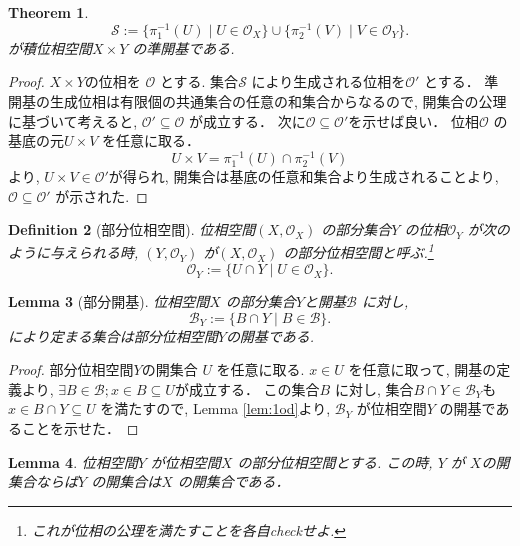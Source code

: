 \documentclass[lualatex]{ltjsbook}
\newtheorem{theorem}{Theorem}[chapter]
\newtheorem{lemma}[theorem]{Lemma}
\newtheorem{definition}[theorem]{Definition}
\theoremstyle{remark}
\theoremstyle{plain}
\begin{document}
\begin{theorem}
	\[
	\mathcal{S}:= \{\pi_1^{-1} \left( U \right)  \mid U \in \mathcal{O}_X		\} \cup \{ \pi_2^{-1} \left( V \right)   \mid  V \in \mathcal{O}_Y\} 
	.\] 
	が積位相空間$X \times Y$ の準開基である.
\end{theorem}

\begin{proof}
	$X\times Y$の位相を $\mathcal{O}$ とする.
	集合$\mathcal{S}$ により生成される位相を$\mathcal{O}'$ とする．
	準開基の生成位相は有限個の共通集合の任意の和集合からなるので,  開集合の公理に基づいて考えると,  $\mathcal{O}' \subseteq \mathcal{O}$ が成立する．
	次に$\mathcal{O} \subseteq \mathcal{O}'$を示せば良い．
	位相$\mathcal{O}$ の基底の元$U\times V $ を任意に取る．
	$$
	U \times V = \pi_1^{-1}\left( U \right) \cap \pi_2^{-1}\left( V \right)  
	$$
	より,  $U \times V \in \mathcal{O}'$が得られ,  開集合は基底の任意和集合より生成されることより,  $\mathcal{O} \subseteq \mathcal{O}'$ が示された.
\end{proof}


\begin{definition}[部分位相空間]
	位相空間$\left( X, \mathcal{O}_X \right) $ の部分集合$Y$ の位相$\mathcal{O}_Y$ が次のように与えられる時,  $(Y, \mathcal{O}_Y)$ が$\left( X,  \mathcal{O}_X \right) $ の部分位相空間と呼ぶ.\footnote{これが位相の公理を満たすことを各自checkせよ.}
	\[
	\mathcal{O}_Y := \{U \cap Y  \mid U \in \mathcal{O}_X\}
	.\] 

\end{definition}

\begin{lemma}[部分開基]
	位相空間$X$ の部分集合$Y$と開基$\mathcal{B}$ に対し,  
	\[
	\mathcal{B}_Y := \{B\cap Y \mid B \in \mathcal{B}\} 
	.\]
	により定まる集合は部分位相空間$Y$の開基である.
\end{lemma}

\begin{proof}
	部分位相空間$Y$の開集合 $U$ を任意に取る.
	$x \in U$ を任意に取って,  開基の定義より,  $\exists B \in \mathcal{B}; x \in B \subseteq U$が成立する．
	この集合$B$ に対し,  集合$B \cap Y \in \mathcal{B}_Y$も $x \in B \cap Y  \subseteq U$ を満たすので,   Lemma \ref{lem:1od}より,  $\mathcal{B}_Y$ が位相空間$Y$ の開基であることを示せた．
\end{proof}

\begin{lemma}
\label{lem:openset}
	位相空間$Y$ が位相空間$X$ の部分位相空間とする.
	この時,  $Y$ が $X$の開集合ならば$Y$ の開集合は$X$ の開集合である．
\end{lemma}
\end{document}
